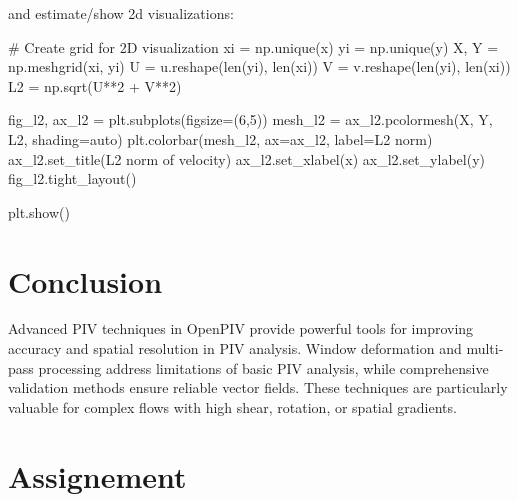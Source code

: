 \documentclass[
  english,
  letterpaper,
  numbers=noendperiod,
  DIV=13]{scrreprt}
\newenvironment{Shaded}{\begin{snugshade}}{\end{snugshade}}
\newcommand{\BuiltInTok}[1]{\textcolor[rgb]{0.00,0.23,0.31}{#1}}
\newcommand{\CommentTok}[1]{\textcolor[rgb]{0.37,0.37,0.37}{#1}}
\newcommand{\DecValTok}[1]{\textcolor[rgb]{0.68,0.00,0.00}{#1}}
\newcommand{\NormalTok}[1]{\textcolor[rgb]{0.00,0.23,0.31}{#1}}
\newcommand{\OperatorTok}[1]{\textcolor[rgb]{0.37,0.37,0.37}{#1}}
\newcommand{\StringTok}[1]{\textcolor[rgb]{0.13,0.47,0.30}{#1}}
\begin{document}
and estimate/show 2d visualizations:

\begin{Shaded}
\begin{Highlighting}[]
\CommentTok{\# Create grid for 2D visualization}
\NormalTok{xi }\OperatorTok{=}\NormalTok{ np.unique(x)}
\NormalTok{yi }\OperatorTok{=}\NormalTok{ np.unique(y)}
\NormalTok{X, Y }\OperatorTok{=}\NormalTok{ np.meshgrid(xi, yi)}
\NormalTok{U }\OperatorTok{=}\NormalTok{ u.reshape(}\BuiltInTok{len}\NormalTok{(yi), }\BuiltInTok{len}\NormalTok{(xi))}
\NormalTok{V }\OperatorTok{=}\NormalTok{ v.reshape(}\BuiltInTok{len}\NormalTok{(yi), }\BuiltInTok{len}\NormalTok{(xi))}
\NormalTok{L2 }\OperatorTok{=}\NormalTok{ np.sqrt(U}\OperatorTok{**}\DecValTok{2} \OperatorTok{+}\NormalTok{ V}\OperatorTok{**}\DecValTok{2}\NormalTok{)}

\NormalTok{fig\_l2, ax\_l2 }\OperatorTok{=}\NormalTok{ plt.subplots(figsize}\OperatorTok{=}\NormalTok{(}\DecValTok{6}\NormalTok{,}\DecValTok{5}\NormalTok{))}
\NormalTok{mesh\_l2 }\OperatorTok{=}\NormalTok{ ax\_l2.pcolormesh(X, Y, L2, shading}\OperatorTok{=}\StringTok{\textquotesingle{}auto\textquotesingle{}}\NormalTok{)}
\NormalTok{plt.colorbar(mesh\_l2, ax}\OperatorTok{=}\NormalTok{ax\_l2, label}\OperatorTok{=}\StringTok{\textquotesingle{}L2 norm\textquotesingle{}}\NormalTok{)}
\NormalTok{ax\_l2.set\_title(}\StringTok{\textquotesingle{}L2 norm of velocity\textquotesingle{}}\NormalTok{)}
\NormalTok{ax\_l2.set\_xlabel(}\StringTok{\textquotesingle{}x\textquotesingle{}}\NormalTok{)}
\NormalTok{ax\_l2.set\_ylabel(}\StringTok{\textquotesingle{}y\textquotesingle{}}\NormalTok{)}
\NormalTok{fig\_l2.tight\_layout()}

\NormalTok{plt.show()  }
\end{Highlighting}
\end{Shaded}

\section{Conclusion}\label{conclusion}

Advanced PIV techniques in OpenPIV provide powerful tools for improving
accuracy and spatial resolution in PIV analysis. Window deformation and
multi-pass processing address limitations of basic PIV analysis, while
comprehensive validation methods ensure reliable vector fields. These
techniques are particularly valuable for complex flows with high shear,
rotation, or spatial gradients.

\section{Assignement}\label{assignement}
\end{document}
